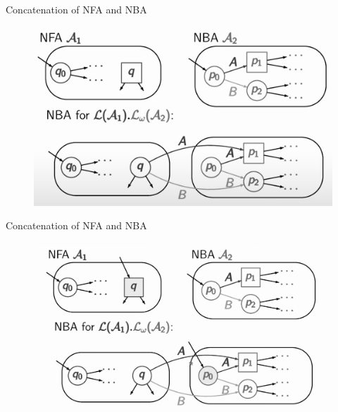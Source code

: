 \documentclass[14pts]{beamer}
\begin{document}
    \begin{frame}{Concatenation of NFA and NBA}
      \begin{figure}
        \centering
        \includegraphics[width=1\textwidth]{photo2.jpeg}
      \end{figure}
    \end{frame}
    \begin{frame}{Concatenation of NFA and NBA}
      \begin{figure}
        \centering
        \includegraphics[width=1\textwidth]{photo3.jpeg}
      \end{figure}
    \end{frame}
\end{document}
